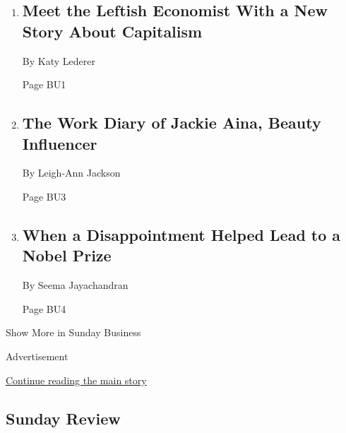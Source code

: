 \begin{enumerate}
\def\labelenumi{\arabic{enumi}.}
\item
  \href{/2019/11/26/business/mariana-mazzucato.html}{}

  \hypertarget{meet-the-leftish-economist-with-a-new-story-about-capitalism-1}{%
  \subsection{Meet the Leftish Economist With a New Story About
  Capitalism}\label{meet-the-leftish-economist-with-a-new-story-about-capitalism-1}}

  By Katy Lederer

  Page BU1
\item
  \href{/2019/11/26/business/jackie-aina-work-diary.html}{}

  \hypertarget{the-work-diary-of-jackie-aina-beauty-influencer}{%
  \subsection{The Work Diary of Jackie Aina, Beauty
  Influencer}\label{the-work-diary-of-jackie-aina-beauty-influencer}}

  By Leigh-Ann Jackson

  Page BU3
\item
  \href{/2019/11/29/business/economics-nobel.html}{}

  \hypertarget{when-a-disappointment-helped-lead-to-a-nobel-prize}{%
  \subsection{When a Disappointment Helped Lead to a Nobel
  Prize}\label{when-a-disappointment-helped-lead-to-a-nobel-prize}}

  By Seema Jayachandran

  Page BU4
\end{enumerate}

Show More in Sunday Business

Advertisement

\protect\hyperlink{after-mid4}{Continue reading the main story}

\hypertarget{sunday-review}{%
\subsection{Sunday Review}\label{sunday-review}}

